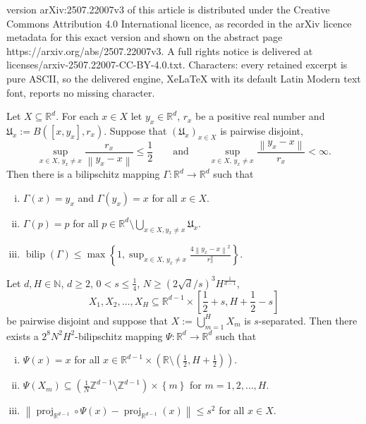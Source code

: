 \documentclass[10pt,a4paper]{amsart}
\DeclareMathOperator{\proj}{proj}
\newcommand{\N}{\mathbb{N}}
\newcommand{\R}{\mathbb{R}}
\newcommand{\Z}{\mathbb{Z}}
\newcommand{\bilip}{\operatorname{bilip}}
\newcommand{\br}[1]{\left(#1\right)}
\newcommand{\enorm}[1]{\left\|#1\right\|}
\newcommand{\mf}[1]{\mathfrak{#1}}
\newcommand{\set}[1]{\left\{#1\right\}}
\newcommand{\sqbr}[1]{\left[#1\right]}
\begin{document}
version arXiv:2507.22007v3 of this article is distributed under the Creative Commons Attribution 4.0 International licence, as recorded in the arXiv licence metadata for this exact version and shown on the abstract page https://arxiv.org/abs/2507.22007v3. A full rights notice is delivered at licenses/arxiv-2507.22007-CC-BY-4.0.txt. Characters: every retained excerpt is pure ASCII, so the delivered engine, XeLaTeX with its default Latin Modern text font, reports no missing character.
\begin{thm}\label{thm:simultaneous_switching}
	Let $X\subseteq \R^{d}$. For each $x\in X$ let $y_{x}\in\R^{d}$, $r_{x}$ be a positive real number and $\mf{U}_{x}:=B([x,y_{x}],r_{x})$.  Suppose that $(\mf{U}_{x})_{x\in X}$ is pairwise disjoint, 
	\begin{equation*}
	\sup_{x\in X,\, y_{x}\neq x}\frac{r_{x}}{\enorm{y_{x}-x}}\leq \frac{1}{2}\qquad\text{and}\qquad\sup_{x\in X,\, y_{x}\neq x}\frac{\enorm{y_{x}-x}}{r_{x}}<\infty.
	\end{equation*}
	Then there is a bilipschitz mapping $\Gamma\colon \R^{d}\to \R^{d}$ such that
	\begin{enumerate}[(i)]
		\item $\Gamma(x)=y_{x}$ and $\Gamma(y_{x})=x$ for all $x\in X$.
		\item $\Gamma(p)=p$ for all $\displaystyle p\in \R^{d}\setminus \bigcup_{x\in X, y_{x}\neq x}\mf{U}_{x}$.
		\item $\displaystyle \bilip(\Gamma)\leq \max\set{1, \sup_{x\in X,\, y_{x}\neq x}\frac{4\enorm{y_{x}-x}^{2}}{r_{x}^{2}}}$.
	\end{enumerate}
\end{thm}

\begin{lemma}\label{lemma:inj_rounding}
	Let $d,H\in\N$, $d\geq2$, $0<s\leq\frac{1}{4}$, $N\geq(2\sqrt{d}/s)^3H^{\frac{1}{d-1}}$,
	\begin{equation*}
	X_{1},X_{2},\ldots,X_{H}\subseteq \R^{d-1}\times \sqbr{\frac{1}{2}+s,H+\frac{1}{2}-s} 
	\end{equation*}
	be pairwise disjoint and suppose that $X:=\displaystyle\bigcup_{m=1}^{H}X_{m}$ is $s$-separated. 
	Then there exists a $\displaystyle 2^{8}N^{2}H^{2}$-bilipschitz mapping $\Psi\colon \R^{d}\to\R^{d}$ such that
	\begin{enumerate}[(i)]
		\item\label{Xi_i} $\Psi(x)=x$ for all $x\in\R^{d-1}\times\br{\R\setminus \br{\frac{1}{2},H+\frac{1}{2}}}$.
		\item\label{Xi_ii} $\Psi(X_{m})\subseteq \br{\frac{1}{N}\Z^{d-1}\setminus \Z^{d-1}}\times\set{m}$ for $m=1,2,\ldots,H$.
		\item\label{Xi_iii} $\enorm{\proj_{\R^{d-1}}\circ \Psi(x)-\proj_{\R^{d-1}}(x)}\leq s^{2}$ for all $x\in X$.
	\end{enumerate}
\end{lemma}
\end{document}
